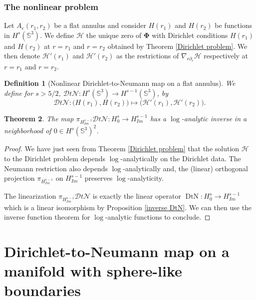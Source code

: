 \documentclass[12pt]{article}
\newtheorem{thm}{Theorem}[section]
\newtheorem{defn}[thm]{Definition}
\begin{document}
    
    \subsubsection{The nonlinear problem}
    Let $A_e(r_1,r_2)$ be a flat annulus and consider $H(r_1)$ and $H(r_2)$ be functions in $H^s(\mathbb{S}^3)$. We define $ \mathcal{H} $ the unique zero of $\mathbf{\Phi}$ with Dirichlet conditions $H(r_1)$ and $H(r_2)$ at $r=r_1$ and $r=r_2$ obtained by Theorem \ref{Dirichlet problem}. We then denote $\mathcal{H}'(r_1)$ and $\mathcal{H}'(r_2)$ as the restrictions of $\nabla_{r\partial_r}\mathcal{H}$ respectively at $r=r_1$ and
    $r=r_2$.
    
    \begin{defn}[Nonlinear Dirichlet-to-Neumann map on a flat annulus]
        We define for $s>5/2$, $\mathcal{D}t\mathcal{N}: H^s(\mathbb{S}^3) \to H^{s-1}(\mathbb{S}^3)$, by $$\mathcal{D}t\mathcal{N}:\big(H(r_1),H(r_2)\big)\mapsto \big(\mathcal{H}'(r_1),\mathcal{H}'(r_2)\big).$$
    \end{defn}
    \begin{thm}
        The map $\pi_{H^{s-1}_{Im}}\mathcal{D}t\mathcal{N}: H^{s}_0\to H^{s-1}_{Im}$ has a $\log$-analytic inverse in a neighborhood of $0\in H^{s}(\mathbb{S}^3)^2$.
    \end{thm}
    \begin{proof}
        We have just seen from Theorem \ref{Dirichlet problem} that the solution $\mathcal{H}$ to the Dirichlet problem depends $\log$-analytically on the Dirichlet data. The Neumann restriction also depends $\log$-analytically and, the (linear) orthogonal projection $\pi_{H^{s-1}_{Im}}$ on $H^{s-1}_{Im}$ preserves $\log$-analyticity.
    
        The linearization $\pi_{H^{s-1}_{Im}}\mathcal{D}t\mathcal{N}$ is exactly the linear operator $\operatorname{DtN}:H^{s}_0 \to H^{s-1}_{Im}$ which is a linear isomorphism by Proposition \ref{inverse DtN}. We can then use the inverse function theorem for $\log$-analytic functions  to conclude.
        
    \end{proof}
    
    \section{Dirichlet-to-Neumann map on a manifold with sphere-like boundaries}
    
\end{document}
